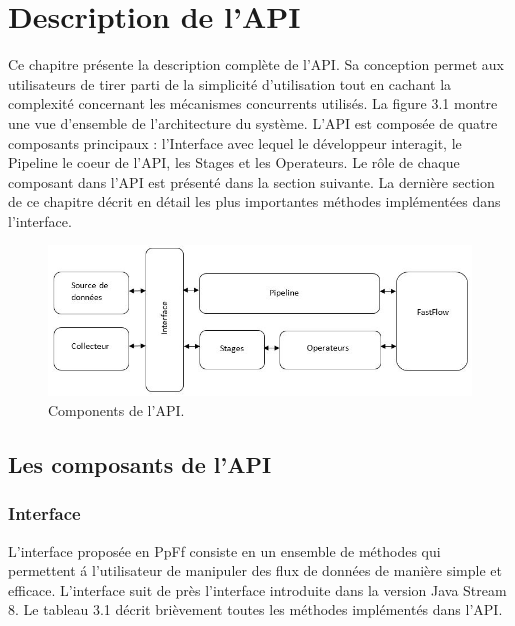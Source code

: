 
\chapter{Description de l'API}
\label{description.chap}

Ce chapitre pr\'esente la description compl\`ete de l'API. Sa conception permet aux utilisateurs de tirer parti de la simplicit\'e d'utilisation tout en cachant la complexit\'e concernant les m\'ecanismes concurrents utilis\'es. La figure 3.1 montre une vue d'ensemble de l'architecture du syst\`eme. L'API est compos\'ee de quatre composants principaux : l'Interface avec lequel le d\'eveloppeur interagit, le Pipeline le coeur de l'API, les Stages et les Operateurs. Le r\^ole de chaque composant dans l'API est pr\'esent\'e dans la section suivante. La derni\`ere section de ce chapitre d\'ecrit en d\'etail les plus importantes m\'ethodes impl\'ement\'ees dans l'interface.



\begin{figure}[ht]
\centering
     \includegraphics[width=1.0\textwidth]{Figures/ComponentsAPI.jpg}
      \caption{Components de l'API.}
       \label{ComponentsAPI.fig}
\end{figure}


\section{Les composants de l'API}

\subsection{Interface}

L'interface propos\'ee en PpFf consiste en un ensemble de m\'ethodes qui permettent \'a l'utilisateur de manipuler des flux de donn\'ees de mani\`ere simple et efficace. L'interface suit de pr\`es l'interface introduite dans la version Java Stream 8. Le tableau 3.1 d\'ecrit bri\`evement toutes les m\'ethodes impl\'ement\'es dans l'API.



